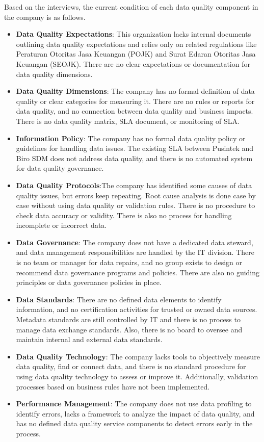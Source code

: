 \documentclass[conference]{IEEEtran}
\begin{document}
Based on the interviews, the current condition of each data quality component in the company is as follows.
\begin{itemize}
\item \textbf{Data Quality Expectations}: This organization lacks internal documents outlining data quality expectations and relies only on related regulations like Peraturan Otoritas Jasa Keuangan (POJK) and Surat Edaran Otoritas Jasa Keuangan (SEOJK). There are no clear expectations or documentation for data quality dimensions.
\item \textbf{Data Quality Dimensions}: The company has no formal definition of data quality or clear categories for measuring it. There are no rules or reports for data quality, and no connection between data quality and business impacts. There is no data quality matrix, SLA document, or monitoring of SLA.
\item \textbf{Information Policy}: The company has no formal data quality policy or guidelines for handling data issues. The existing SLA between Pusintek and Biro SDM does not address data quality, and there is no automated system for data quality governance.
\item \textbf{Data Quality Protocols}:The company has identified some causes of data quality issues, but errors keep repeating. Root cause analysis is done case by case without using data quality or validation rules. There is no procedure to check data accuracy or validity. There is also no process for handling incomplete or incorrect data.
\item \textbf{Data Governance}: The company does not have a dedicated data steward, and data management responsibilities are handled by the IT division. There is no team or manager for data repairs, and no group exists to design or recommend data governance programs and policies. There are also no guiding principles or data governance policies in place.
\item \textbf{Data Standards}: There are no defined data elements to identify information, and no certification activities for trusted or owned data sources. Metadata standards are still controlled by IT and there is no process to manage data exchange standards. Also, there is no board to oversee and maintain internal and external data standards.
\item \textbf{Data Quality Technology}: The company lacks tools to objectively measure data quality, find or connect data, and there is no standard procedure for using data quality technology to assess or improve it. Additionally, validation processes based on business rules have not been implemented.
\item \textbf{Performance Management}: The company does not use data profiling to identify errors, lacks a framework to analyze the impact of data quality, and has no defined data quality service components to detect errors early in the process.
\end{itemize}
\end{document}
